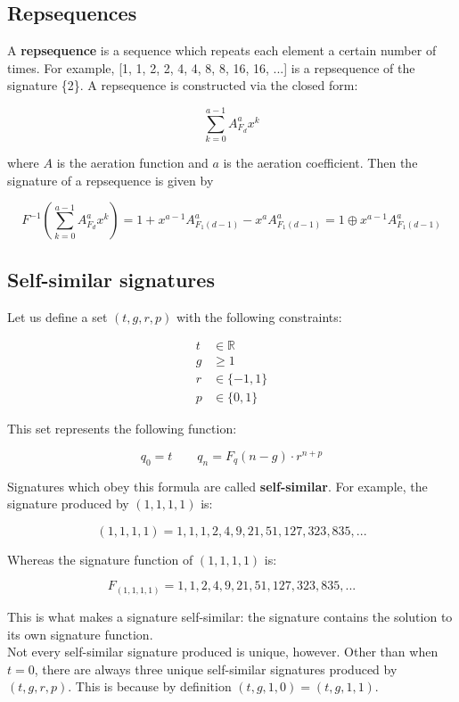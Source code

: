 \documentclass{article}
\begin{document}
\subsection{Repsequences}

A \textbf{repsequence} is a sequence which repeats each element a certain number of times. For example, [1, 1, 2, 2, 4, 4, 8, 8, 16, 16, ...] is a repsequence of the signature \{2\}. A repsequence is constructed via the closed form:

$$\sum_{k=0}^{a-1} A_{F_d}^a x^k$$

\noindent where $A$ is the aeration function and $a$ is the aeration coefficient. Then the signature of a repsequence is given by

$$F^{-1} \left( \sum_{k=0}^{a-1} A_{F_d}^a x^k \right) = 1 + x^{a-1} A_{F_1 (d-1)}^a - x^a A_{F_1 (d-1)}^a = 1 \oplus x^{a-1} A_{F_1 (d-1)}^a$$

\subsection{Self-similar signatures}

Let us define a set $(t, g, r, p)$ with the following constraints:

\begin{align*}
t &\in \mathbb{R}\\
g &\geq 1\\
r &\in \{-1, 1\}\\
p &\in \{0, 1\}
\end{align*}

\noindent This set represents the following function:

$$q_0 = t \qquad q_n = F_q (n - g) \cdot r^{n+p}$$

\noindent Signatures which obey this formula are called \textbf{self-similar}. For example, the signature produced by $(1, 1, 1, 1)$ is:

$$(1, 1, 1, 1) = 1, 1, 1, 2, 4, 9, 21, 51, 127, 323, 835, ...$$

\noindent Whereas the signature function of $(1, 1, 1, 1)$ is:

$$F_{(1, 1, 1, 1)} = 1, 1, 2, 4, 9, 21, 51, 127, 323, 835, ...$$

\noindent This is what makes a signature self-similar: the signature contains the solution to its own signature function.\\

\noindent Not every self-similar signature produced is unique, however. Other than when $t = 0$, there are always three unique self-similar signatures produced by $(t, g, r,  p)$. This is because by definition $(t, g, 1, 0) = (t, g, 1, 1)$.\\
\end{document}
